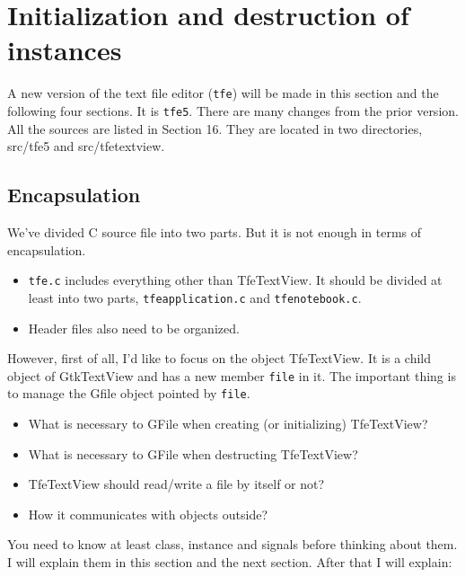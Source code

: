 \hypertarget{initialization-and-destruction-of-instances}{%
\section{Initialization and destruction of
instances}\label{initialization-and-destruction-of-instances}}

A new version of the text file editor (\passthrough{\lstinline!tfe!})
will be made in this section and the following four sections. It is
\passthrough{\lstinline!tfe5!}. There are many changes from the prior
version. All the sources are listed in Section 16. They are located in
two directories, src/tfe5 and src/tfetextview.

\hypertarget{encapsulation}{%
\subsection{Encapsulation}\label{encapsulation}}

We've divided C source file into two parts. But it is not enough in
terms of encapsulation.

\begin{itemize}
\tightlist
\item
  \passthrough{\lstinline!tfe.c!} includes everything other than
  TfeTextView. It should be divided at least into two parts,
  \passthrough{\lstinline!tfeapplication.c!} and
  \passthrough{\lstinline!tfenotebook.c!}.
\item
  Header files also need to be organized.
\end{itemize}

However, first of all, I'd like to focus on the object TfeTextView. It
is a child object of GtkTextView and has a new member
\passthrough{\lstinline!file!} in it. The important thing is to manage
the Gfile object pointed by \passthrough{\lstinline!file!}.

\begin{itemize}
\tightlist
\item
  What is necessary to GFile when creating (or initializing)
  TfeTextView?
\item
  What is necessary to GFile when destructing TfeTextView?
\item
  TfeTextView should read/write a file by itself or not?
\item
  How it communicates with objects outside?
\end{itemize}

You need to know at least class, instance and signals before thinking
about them. I will explain them in this section and the next section.
After that I will explain:

